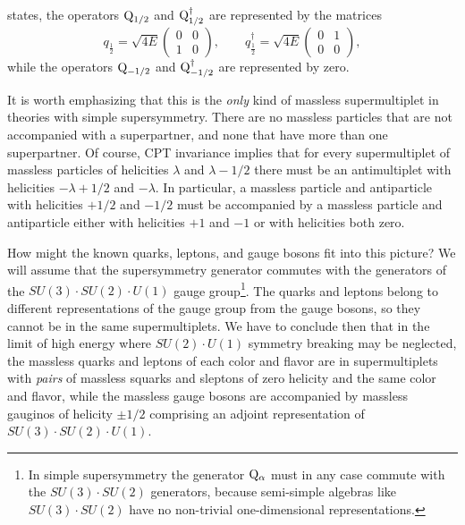 states, the operators $\mathrm{Q}_{1/2}$ and $\mathrm{Q}^\dagger_{1/2}$ are
represented by the matrices
\begin{equation}
  q_{\frac12}=\sqrt{4E}
  \begin{pmatrix}
    0&0\\
    1&0
  \end{pmatrix},
  \qquad
  q^\dagger_{\frac12}=\sqrt{4E}
  \begin{pmatrix}
    0&1\\
    0&0
  \end{pmatrix},
  \tag{25.4.8}\label{eq:25.4.8}
\end{equation}
while the operators $\mathrm{Q}_{-1/2}$ and $\mathrm{Q}^\dagger_{-1/2}$ are
represented by zero.

It is worth emphasizing that this is the \emph{only} kind of massless
supermultiplet in theories with simple supersymmetry. There are no massless
particles that are not accompanied with a superpartner, and none that have
more than one superpartner. Of course, CPT invariance implies that for every
supermultiplet of massless particles of helicities $\lambda$ and
$\lambda-1/2$ there must be an antimultiplet with helicities
$-\lambda+1/2$ and $-\lambda$. In particular, a massless particle and
antiparticle with helicities $+1/2$ and $-1/2$ must be accompanied by a
massless particle and antiparticle either with helicities $+1$ and $-1$ or
with helicities both zero.

How might the known quarks, leptons, and gauge bosons fit into this picture?
We will assume that the supersymmetry generator commutes with the generators
of the $SU(3)\cdot SU(2)\cdot U(1)$ gauge group\footnote{In simple
supersymmetry the generator $\mathrm{Q}_\alpha$ must in any case commute with the
$SU(3)\cdot SU(2)$ generators, because semi-simple algebras like
$SU(3)\cdot SU(2)$ have no non-trivial one-dimensional representations.}.
The quarks and leptons belong to different representations of the gauge group
from the gauge bosons, so they cannot be in the same supermultiplets. We have
to conclude then that in the limit of high energy where $SU(2)\cdot U(1)$
symmetry breaking may be neglected, the massless quarks and leptons of each
color and flavor are in supermultiplets with \emph{pairs} of massless squarks
and sleptons of zero helicity and the same color and flavor, while the massless
gauge bosons are accompanied by massless gauginos of helicity $\pm1/2$
comprising an adjoint representation of $SU(3)\cdot SU(2)\cdot U(1)$.

